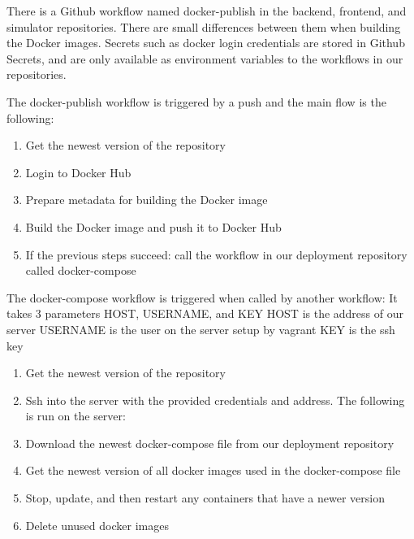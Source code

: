 There is a Github workflow named docker-publish in the backend, frontend, and simulator repositories.
There are small differences between them when building the Docker images.
Secrets such as docker login credentials are stored in Github Secrets, and are only available as environment variables to the workflows in our repositories.

The docker-publish workflow is triggered by a push and the main flow is the following:
\begin{enumerate}
\item Get the newest version of the repository
\item Login to Docker Hub
\item Prepare metadata for building the Docker image
\item Build the Docker image and push it to Docker Hub
\item If the previous steps succeed: call the workflow in our deployment repository called docker-compose
\end{enumerate}


The docker-compose workflow is triggered when called by another workflow:
It takes 3 parameters HOST, USERNAME, and KEY
HOST is the address of our server
USERNAME is the user on the server setup by vagrant
KEY is the ssh key
\begin{enumerate}
\item Get the newest version of the repository
\item Ssh into the server with the provided credentials and address. The following is run on the server:
\item Download the newest docker-compose file from our deployment repository
\item Get the newest version of all docker images used in the docker-compose file
\item Stop, update, and then restart any containers that have a newer version
\item Delete unused docker images
\end{enumerate}

